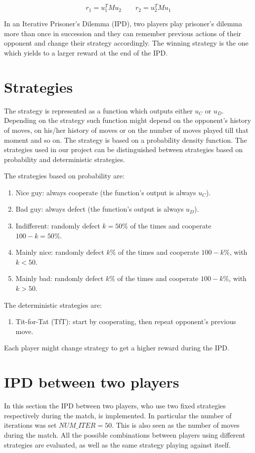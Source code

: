 \documentclass[journal,a4paper,10pt,twoside]{IEEEtran}
\begin{document}
$$
r_1 = u_1^T M u_2
\quad
\quad
r_2 = u_2^T M u_1
$$

In an Iterative Prisoner's Dilemma (IPD), two players play prisoner's dilemma more than once in succession and they can remember previous actions of their opponent and change their strategy accordingly. The winning strategy is the one which yields to a larger reward at the end of the IPD.

\section{Strategies} \label{Strategies}

The strategy is represented as a function which outputs either $u_C$ or $u_D$. Depending on the strategy such function might depend on the opponent's history of moves, on his/her history of moves or on the number of moves played till that moment and so on. The strategy is based on a probability density function. The strategies used in our project can be distinguished between strategies based on probability and deterministic strategies.

The strategies based on probability are:

\begin{enumerate}
    \item Nice guy: always cooperate (the function's output is always $u_C$).
    \item Bad guy: always defect (the function's output is always $u_D$).
    \item Indifferent: randomly defect $k=50\%$ of the times and cooperate $100-k=50\%$.
    \item Mainly nice: randomly defect $k\%$ of the times and cooperate $100-k\%$, with $k<50$.
    \item Mainly bad: randomly defect $k\%$ of the times and cooperate $100-k\%$, with $k>50$.
\end{enumerate}

The deterministic strategies are:
\begin{enumerate}
    \item Tit-for-Tat (TfT): start by cooperating, then repeat opponent's previous move.
\end{enumerate}

Each player might change strategy to get a higher reward during the IPD.

\section{IPD between two players} \label{IPD2P}
In this section the IPD between two players, who use two fixed strategies respectively during the match, is implemented.
In particular the number of iterations was set $NUM\_ITER = 50$. This is also seen as the number of moves during the match. All the possible combinations between players using different strategies are evaluated, as well as the same strategy playing against itself.
\end{document}
